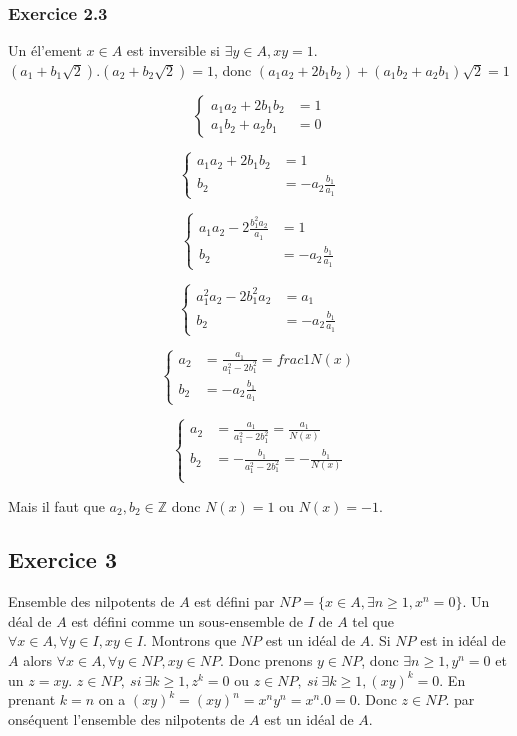 \documentclass[]{book}
\theoremstyle{definition}
\newcommand{\bb}[1]{\mathbb{#1}}
\newcommand{\Z}{\bb{Z}}
\begin{document}
\subsubsection*{Exercice 2.3}
Un \'el'ement $x \in A$ est inversible si $\exists y \in A, xy = 1$. $(a_1+b_1\sqrt{2}).(a_2+b_2\sqrt{2}) = 1$, donc $(a_1a_2+2b_1b_2) + (a_1b_2+a_2b_1)\sqrt{2} = 1$

$$
\left\{ \begin{array}{ll}
a_1a_2+2b_1b_2 &= 1\\
a_1b_2+a_2b_1 &= 0
\end{array}
\right.
$$

$$
\left\{ \begin{array}{ll}
a_1a_2+2b_1b_2 &= 1\\
b_2 &= -a_2\frac{b_1}{a_1}
\end{array}
\right.
$$

$$
\left\{ \begin{array}{ll}
a_1a_2-2\frac{b_1^2a_2}{a_1} &= 1\\
b_2 &= -a_2\frac{b_1}{a_1}
\end{array}
\right.
$$

$$
\left\{ \begin{array}{ll}
a_1^2a_2-2b_1^2a_2 &= a_1\\
b_2 &= -a_2\frac{b_1}{a_1}
\end{array}
\right.
$$

$$
\left\{ \begin{array}{ll}
a_2 &= \frac{a_1}{a_1^2-2b_1^2} = frac{1}{N(x)}\\
b_2 &= -a_2\frac{b_1}{a_1}
\end{array}
\right.
$$

$$
\left\{ \begin{array}{ll}
a_2 &= \frac{a_1}{a_1^2-2b_1^2} = \frac{a_1}{N(x)}\\
b_2 &= -\frac{b_1}{a_1^2-2b_1^2} = -\frac{b_1}{N(x)}\\
\end{array}
\right.
$$

Mais il faut que $a_2, b_2 \in \Z$ donc $N(x) = 1$ ou $N(x) = -1$.

\subsection*{Exercice 3}
Ensemble des nilpotents de $A$ est d\'efini par $NP = \{x \in A, \exists n \geq 1, x^n = 0\}$. Un d\'eal de $A$ est d\'efini comme un sous-ensemble de $I$ de $A$ tel que $\forall x \in A, \forall y \in I, xy \in I$. Montrons que $NP$ est un id\'eal de $A$. Si $NP$ est in id\'eal de $A$ alors $\forall x \in A, \forall y \in NP, xy \in NP$. Donc prenons $y \in NP$, donc $\exists n \geq 1, y^n = 0$ et un $z=xy$. $z \in NP,\ si\ \exists k \geq 1, z^k = 0$ ou $z \in NP,\ si\ \exists k \geq 1, (xy)^k = 0$. En prenant $k=n$ on a $(xy)^k = (xy)^n = x^ny^n = x^n.0 = 0$. Donc $z \in NP$. par ons\'equent l'ensemble des nilpotents de $A$ est un id\'eal de $A$. 
\end{document}
